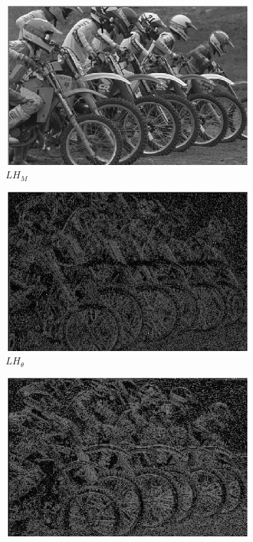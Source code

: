 \begin{figure}
\begin{subfigure}[b]{0.23\textwidth}
         \includegraphics[width=\textwidth]{./figs/m_1_1_q}
         \caption{$LH_M$}
         \label{fig:qwt5}
     \end{subfigure}
     \begin{subfigure}[b]{0.23\textwidth}
         \centering
         \includegraphics[width=\textwidth]{./figs/o_1_2_1_q}
         \caption{$LH_{\theta}$}
         \label{fig:qwt6}
     \end{subfigure}
     \begin{subfigure}[b]{0.23\textwidth}
         \centering
         \includegraphics[width=\textwidth]{./figs/o_1_2_2_q}

\end{subfigure}
\end{figure}
